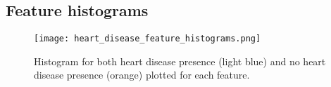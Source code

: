 \documentclass[a4paper,twocolumn]{article}
\begin{document}
\begin{appendices}
    \section{Feature histograms}\label{app:B}
    \begin{figure}[ht!]
    \centering
    \texttt{[image: heart\_disease\_feature\_histograms.png]}
    \caption{Histogram for both heart disease presence (light blue) and no heart disease presence (orange) plotted for each feature.}
    \end{figure}
\end{appendices}
\end{document}
